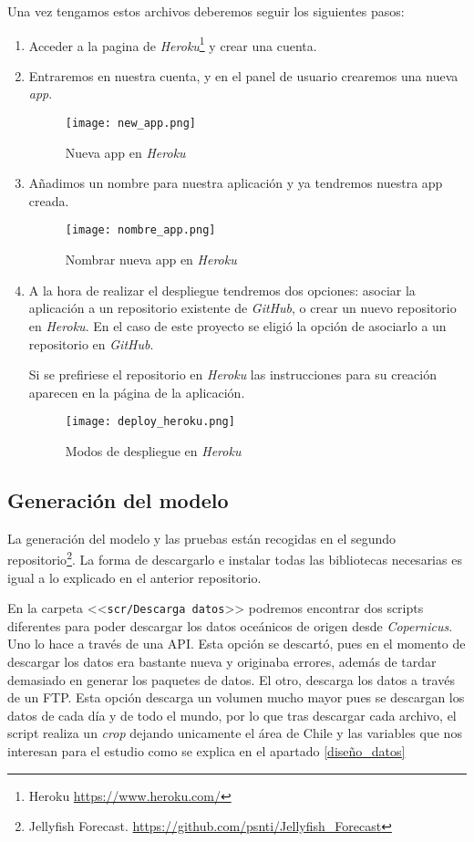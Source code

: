 Una vez tengamos estos archivos deberemos seguir los siguientes pasos:
\begin{enumerate}
	\item Acceder a la pagina de \emph{Heroku}\footnote{Heroku \url{https://www.heroku.com/}} y crear una cuenta.
	\item Entraremos en nuestra cuenta, y en el panel de usuario crearemos una nueva \emph{app}.
	\begin{figure}[!h]
		\centering
		\texttt{[image: new\_app.png]}
		\caption{Nueva app en \emph{Heroku}}\label{fig:new_app}
	\end{figure}
	\item Añadimos un nombre para nuestra aplicación y ya tendremos nuestra app creada.
	\begin{figure}[!h]
		\centering
		\texttt{[image: nombre\_app.png]}
		\caption{Nombrar nueva app en \emph{Heroku}}\label{fig:new_app}
	\end{figure}
	\item A la hora de realizar el despliegue tendremos dos opciones: asociar la aplicación a un repositorio existente de \emph{GitHub}, o crear un nuevo repositorio en \emph{Heroku}. En el caso de este proyecto se eligió la opción de asociarlo a un repositorio en \emph{GitHub}. 
	
	Si se prefiriese el repositorio en \emph{Heroku} las instrucciones para su creación aparecen en la página de la aplicación.
	\begin{figure}[!h]
		\centering
		\texttt{[image: deploy\_heroku.png]}
		\caption{Modos de despliegue en \emph{Heroku}}\label{fig:deploy}
	\end{figure}
		
\end{enumerate}

\subsection{Generación del modelo}

La generación del modelo y las pruebas están recogidas en el segundo repositorio\footnote{Jellyfish Forecast. \url{https://github.com/psnti/Jellyfish_Forecast}}. La forma de descargarlo e instalar todas las bibliotecas necesarias es igual a lo explicado en el anterior repositorio.

En la carpeta <<\texttt{scr/Descarga datos}>> podremos encontrar dos scripts diferentes para poder descargar los datos oceánicos de origen desde \emph{Copernicus}. Uno lo hace a través de una API. Esta opción se descartó, pues en el momento de descargar los datos era bastante nueva y originaba errores, además de tardar demasiado en generar los paquetes de datos. El otro, descarga los datos a través de un FTP. Esta opción descarga un volumen mucho mayor pues se descargan los datos de cada día y de todo el mundo, por lo que tras descargar cada archivo, el script realiza un \emph{crop} dejando unicamente el área de Chile y las variables que nos interesan para el estudio como se explica en el apartado \ref{diseño_datos}

